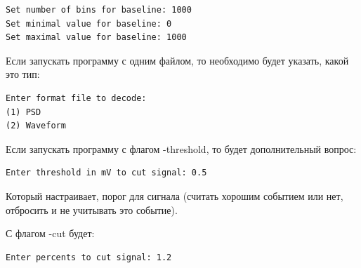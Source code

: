 \documentclass[12pt,a4paper,openany]{article}
\begin{document}
\begin{lstlisting}
Set number of bins for baseline: 1000
Set minimal value for baseline: 0
Set maximal value for baseline: 1000
\end{lstlisting}

Если запускать программу с одним файлом, то необходимо будет указать, какой это тип:
\begin{lstlisting}
Enter format file to decode:
(1) PSD
(2) Waveform
\end{lstlisting}

Если запускать программу с флагом -threshold, то будет дополнительный вопрос:
\begin{lstlisting}
Enter threshold in mV to cut signal: 0.5
\end{lstlisting}

Который настраивает, порог для сигнала (считать хорошим событием или нет, отбросить и не учитывать это событие).

С флагом -cut будет:
\begin{lstlisting}
Enter percents to cut signal: 1.2
\end{lstlisting}
\end{document}
